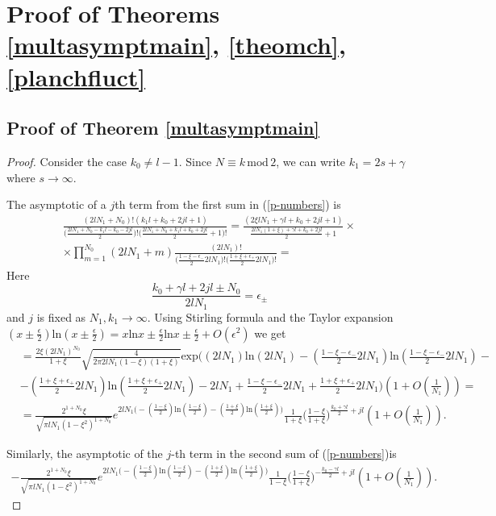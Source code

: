 \documentclass[11pt]{amsart}
\begin{document}
\section{Proof of Theorems \ref{multasymptmain}, \ref{theomch}, \ref{planchfluct}}\label{prthu2}
\subsection{Proof of Theorem \ref{multasymptmain}}\label{apmultas}
\begin{proof}
    Consider the case $k_0\neq l-1$. Since $N\equiv k\,\mathrm{mod}\,2$, we can write $k_1=2s+\gamma$ where $s\to\infty$.

 
    The asymptotic of a $j$th term from the first sum in (\ref{p-numbers}) is
	\begin{eqnarray*}
		\frac{(2lN_1+N_0)!(k_1l+k_0+2jl+1)}{\big(\frac{2lN_1+N_0-k_1l-k_0-2jl}{2}\big)! \big(\frac{2lN_1+N_0+k_1l+k_0+2jl}{2}+1\big)!}=\frac{(2\xi lN_1+\gamma l+k_0+2jl+1)}{\frac{2lN_1(1+\xi)+\gamma l+k_0+2jl}{2}+1}\times\\
		\times\prod_{m=1}^{N_0}(2lN_1+m)\frac{(2lN_1)!}{\big(\frac{1-\xi-\epsilon_-}{2}2lN_1\big)! \big(\frac{1+\xi+\epsilon_+}{2}2lN_1\big)!}=
	\end{eqnarray*}
	Here 
    $$
    \frac{k_0+\gamma l+2jl\pm N_0}{2lN_1}=\epsilon_\pm
    $$ 
    and $j$ is fixed as $N_1, k_1\to \infty$. Using Stirling formula and the Taylor expansion $(x\pm\frac{\epsilon}{2})\mathrm{ln}(x\pm\frac{\epsilon}{2})=x\mathrm{ln}x\pm\frac{\epsilon}{2}\mathrm{ln}x\pm\frac{\epsilon}{2}+O(\epsilon^2)$ we get
	\begin{eqnarray*}
		&=\frac{2\xi(2lN_1)^{N_0}}{1+\xi} \sqrt{\frac{4}{2\pi 2lN_1(1-\xi)(1+\xi)}}\mathrm{exp}\Big((2lN_1)\mathrm{ln}(2lN_1)- \left(\frac{1-\xi -\epsilon_-}{2}2lN_1\right)\mathrm{ln}\left(\frac{1-\xi-\epsilon_-}{2}2lN_1\right)-\\
		&-\left(\frac{1+\xi+\epsilon_+}{2}2lN_1\right)\mathrm{ln}\left(\frac{1+\xi +\epsilon_+}{2}2lN_1\right)-2lN_1+\frac{1-\xi -\epsilon_-}{2}2lN_1+\frac{1+\xi +\epsilon_+}{2}2lN_1\Big)\left(1+O\left(\frac{1}{N_1}\right)\right)=\\
		&=\frac{2^{1+N_0}\xi}{\sqrt{\pi lN_1 (1-\xi^2)^{1+N_0}}} e^{2lN_1\big(- (\frac{1-\xi}{2})\mathrm{ln}(\frac{1-\xi}{2})-(\frac{1+\xi}{2})\mathrm{ln}(\frac{1+\xi }{2})\big)}\frac{1}{1+\xi}\Big(\frac{1-\xi}{1+\xi}\Big)^{\frac{k_0+\gamma l}{2}+jl}\left(1+O\left(\frac{1}{N_1}\right)\right).
	\end{eqnarray*}

    
	Similarly, the asymptotic of the $j$-th term in the second sum of (\ref{p-numbers})is
	\begin{eqnarray*}
		-\frac{2^{1+N_0}\xi}{\sqrt{\pi lN_1 (1-\xi^2)^{1+N_0}}} e^{2lN_1\big(- (\frac{1-\xi}{2})\mathrm{ln}(\frac{1-\xi}{2})-(\frac{1+\xi}{2})\mathrm{ln}(\frac{1+\xi}{2})\big)}\frac{1}{1-\xi}\Big(\frac{1-\xi}{1+\xi}\Big)^{-\frac{k_0-\gamma l}{2}+jl}\left(1+O\left(\frac{1}{N_1}\right)\right).
	\end{eqnarray*}


\end{proof}
\end{document}
